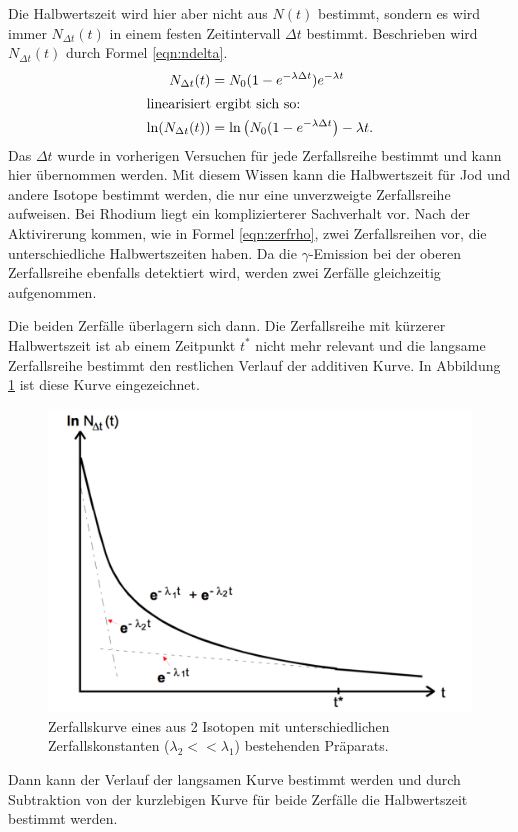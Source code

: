 Die Halbwertszeit wird hier aber nicht aus $N(t)$ bestimmt, sondern es wird immer
$N_{\Delta t}(t)$ in einem festen Zeitintervall $\Delta t$ bestimmt.
Beschrieben wird $N_{\Delta t}(t)$ durch Formel \eqref{eqn:ndelta}.
\begin{align}
  N_{\Delta t}(t) &= N_0(1 - e^{-\lambda\Delta t}) e^{-\lambda t} \label{eqn:ndelta}\\
  \intertext{linearisiert ergibt sich so:}
  \ln(N_{\Delta t}(t)) &= \ln\left( N_0(1-e^{-\lambda\Delta t}\right) - \lambda t \label{eqn:ndeltalinear}.
\end{align}
Das $\Delta t$ wurde in vorherigen Versuchen für jede Zerfallsreihe bestimmt und kann hier übernommen
werden. Mit diesem Wissen kann die Halbwertszeit für Jod und andere Isotope bestimmt werden,
die nur eine unverzweigte Zerfallsreihe aufweisen.
Bei Rhodium liegt ein komplizierterer Sachverhalt vor. Nach der Aktivirerung kommen,
wie in Formel \eqref{eqn:zerfrho}, zwei Zerfallsreihen vor, die unterschiedliche Halbwertszeiten
haben. Da die $\gamma$-Emission bei der oberen Zerfallsreihe ebenfalls detektiert wird,
werden zwei Zerfälle gleichzeitig aufgenommen.

Die beiden Zerfälle überlagern sich dann. Die Zerfallsreihe mit kürzerer Halbwertszeit
ist ab einem Zeitpunkt $t^*$ nicht mehr relevant und die langsame Zerfallsreihe bestimmt den restlichen Verlauf
der additiven Kurve. In Abbildung \ref{fig:additivekurve} ist diese Kurve eingezeichnet.%
\begin{figure}[h]
  \centering
  \includegraphics[width = \textwidth]{Pics/additivekurve.pdf}
  \caption{Zerfallskurve eines aus 2 Isotopen mit unterschiedlichen Zerfallskonstanten
   ($\lambda_2 << \lambda_1$) bestehenden Präparats.\cite{anleitung}}
  \label{fig:additivekurve}
\end{figure}
Dann kann der Verlauf der langsamen Kurve bestimmt werden und durch Subtraktion
von der kurzlebigen Kurve für beide Zerfälle die Halbwertszeit bestimmt werden.
